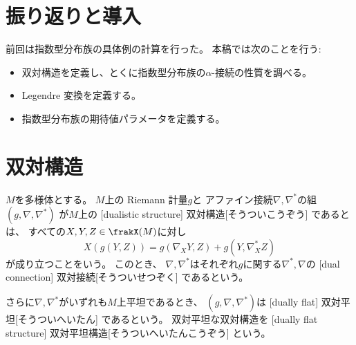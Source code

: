 \documentclass[report]{jlreq}
\begin{document}
%

%
\section*{振り返りと導入}

前回は指数型分布族の具体例の計算を行った。
本稿では次のことを行う:
\begin{itemize}
    \item 双対構造を定義し、とくに指数型分布族の$\alpha$-接続の性質を調べる。
    \item Legendre 変換を定義する。
    \item 指数型分布族の期待値パラメータを定義する。
\end{itemize}

%
\section{双対構造}

\begin{definition}[双対構造]
    $M$を多様体とする。
    $M$上の
    Riemann 計量$g$と
    アファイン接続$\nabla, \nabla^*$の組
    $(g, \nabla, \nabla^*)$
    が$M$上の
    [dualistic structure]
        {双対構造}[そうついこうぞう]
    であるとは、
    すべての$X, Y, Z \in \frakX(M)$に対し
    \begin{equation}
        X(g(Y, Z))
            =
                g(\nabla_X Y, Z) + g(Y, \nabla^*_X Z)
    \end{equation}
    が成り立つことをいう。
    このとき、
    $\nabla, \nabla^*$はそれぞれ$g$に関する$\nabla^*, \nabla$の
    [dual connection]
        {双対接続}[そうついせつぞく]
    であるという。

    さらに$\nabla, \nabla^*$がいずれも$M$上平坦であるとき、
    $(g, \nabla, \nabla^*)$は
    [dually flat]
        {双対平坦}[そうついへいたん]
    であるという。
    双対平坦な双対構造を
    [dually flat structure]
        {双対平坦構造}[そうついへいたんこうぞう]
    という。
\end{definition}

\end{document}
